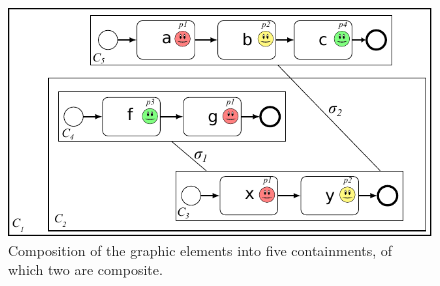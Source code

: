 \begin{figure}
\centering
\includegraphics[width=.6\linewidth]{figures/visualization-elements/al-elements-together}
\caption{Composition of the graphic elements into five containments, of which two are composite.}
\label{fig:all-elements-together}
\end{figure}

